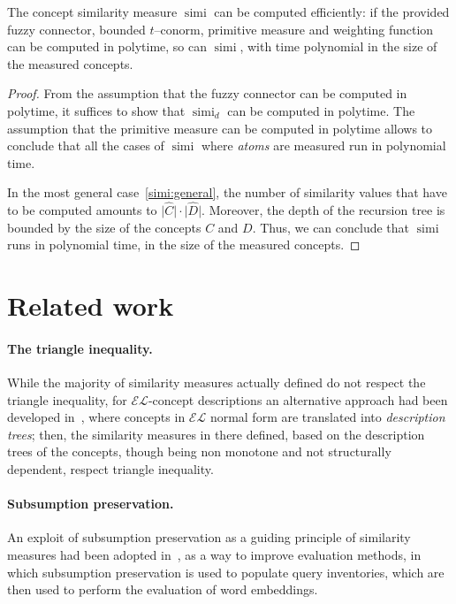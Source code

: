 \documentclass[]{llncs}
\DeclareMathOperator{\simi}{simi}
\newcommand{\el}{\(\mathcal{EL}{}\)}
\begin{document}
  \begin{proposition}
    The concept similarity measure \(\simi\) can be computed efficiently: if the provided fuzzy connector, bounded \(t\)--conorm, primitive measure and weighting function can be computed in polytime, so can \(\simi\), with time polynomial in the size of the measured concepts.
  \end{proposition}
  \begin{proof}
    From the assumption that the fuzzy connector can be computed in polytime, it suffices to show that \(\simi_d\) can be computed in polytime.
    The assumption that the primitive measure can be computed in polytime allows to conclude that all the cases of \(\simi\) where \emph{atoms} are measured run in polynomial time.

    In the most general case~\eqref{simi:general}, the number of similarity values that have to be computed amounts to \(\lvert \widehat{C} \rvert \cdot \lvert \widehat{D} \rvert\).
    Moreover, the depth of the recursion tree is bounded by the size of the concepts \(C\) and \(D\).
    Thus, we can conclude that \(\simi\) runs in polynomial time, in the size of the measured concepts.
  \end{proof}

  \section{Related work}

  \paragraph{The triangle inequality.} While the majority of similarity measures actually defined do not respect the triangle inequality, for \el-concept descriptions an alternative approach had been developed in~\cite{DAB14}, where concepts in \el{} normal form are translated into \emph{description trees}; then, the similarity measures in there defined, based on the description trees of the concepts, though being non monotone and not structurally dependent, respect triangle inequality.

  \paragraph{Subsumption preservation.} An exploit of subsumption preservation as a guiding principle of similarity measures had been adopted in~\cite{Se16},
  as a way to improve evaluation methods, in which subsumption preservation is used to populate query inventories, which are then used to perform the evaluation of word embeddings.
\end{document}
